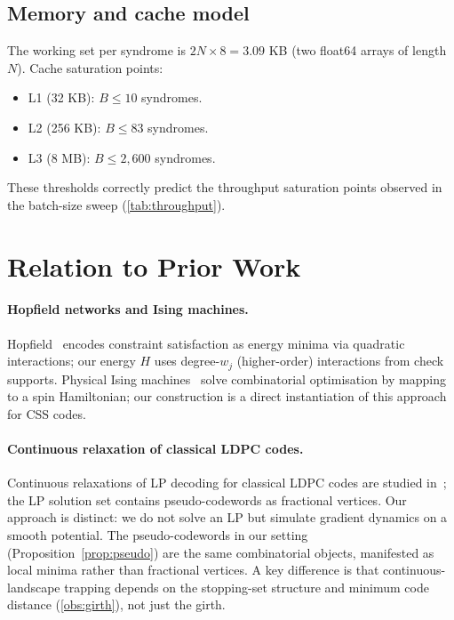 \documentclass[12pt,a4paper]{article}
\theoremstyle{plain}
\theoremstyle{definition}
\theoremstyle{remark}
\begin{document}
\subsection{Memory and cache model}

The working set per syndrome is $2N\times 8 = 3.09$ KB (two float64 arrays
of length $N$).
Cache saturation points:
\begin{itemize}[noitemsep]
\item L1 (32 KB): $B \leq 10$ syndromes.
\item L2 (256 KB): $B \leq 83$ syndromes.
\item L3 (8 MB): $B \leq 2{,}600$ syndromes.
\end{itemize}
These thresholds correctly predict the throughput saturation points
observed in the batch-size sweep (\cref{tab:throughput}).

\section{Relation to Prior Work}\label{sec:prior}

\paragraph{Hopfield networks and Ising machines.}
Hopfield~\cite{Hopfield1982} encodes constraint satisfaction as energy
minima via quadratic interactions; our energy $H$ uses degree-$w_j$
(higher-order) interactions from check supports.
Physical Ising machines~\cite{Inagaki2016} solve combinatorial
optimisation by mapping to a spin Hamiltonian; our construction is a
direct instantiation of this approach for CSS codes.

\paragraph{Continuous relaxation of classical LDPC codes.}
Continuous relaxations of LP decoding for classical LDPC codes are
studied in~\cite{Feldman2005}; the LP solution set contains
pseudo-codewords as fractional vertices.
Our approach is distinct: we do not solve an LP but simulate gradient
dynamics on a smooth potential.
The pseudo-codewords in our setting (Proposition~\ref{prop:pseudo})
are the same combinatorial objects, manifested as local minima rather
than fractional vertices.
A key difference is that continuous-landscape trapping depends on the
stopping-set structure and minimum code distance
(\cref{obs:girth}), not just the girth.
\end{document}
